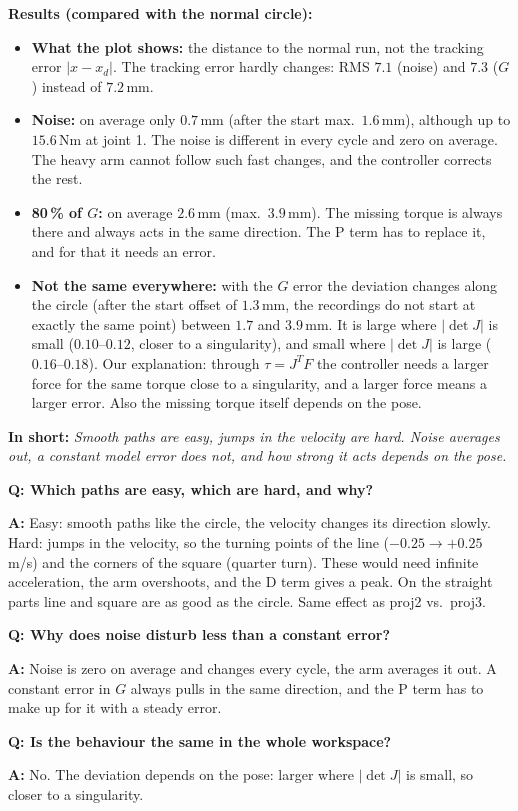 \documentclass[10pt,a4paper]{article}
\newcommand{\frage}[2]{\textbf{Q: #1}\par\nopagebreak\vspace{1pt}\textbf{A:} #2\par\vspace{5pt}}
\newcommand{\sagen}[1]{\textbf{In short:} \emph{#1}\par}
\begin{document}
\textbf{Results (compared with the normal circle):}
\begin{itemize}
  \item \textbf{What the plot shows:} the distance to the normal run, not the tracking error $|x - x_d|$. The tracking error hardly changes: RMS $7.1$ (noise) and $7.3$ ($G$) instead of $7.2$\,mm.
  \item \textbf{Noise:} on average only $0.7$\,mm (after the start max.\ $1.6$\,mm), although up to $15.6$\,Nm at joint 1. The noise is
        different in every cycle and zero on average. The heavy arm cannot follow such fast changes, and the controller
        corrects the rest.
  \item \textbf{80\,\% of $G$:} on average $2.6$\,mm (max.\ $3.9$\,mm). The missing torque is always there and always acts
        in the same direction. The P term has to replace it, and for that it needs an error.
  \item \textbf{Not the same everywhere:} with the $G$ error the deviation changes along the circle (after the start offset of $1.3$\,mm, the recordings do not start at exactly the same point) between $1.7$ and
        $3.9$\,mm. It is large where $|\det J|$ is small ($0.10$--$0.12$, closer to a singularity), and small where
        $|\det J|$ is large ($0.16$--$0.18$). Our explanation: through $\tau = J^T F$ the controller needs a larger force
        for the same torque close to a singularity, and a larger force means a larger error. Also the missing torque
        itself depends on the pose.
\end{itemize}

\sagen{Smooth paths are easy, jumps in the velocity are hard. Noise averages out, a constant model error does not, and
how strong it acts depends on the pose.}

\begin{fragen}
\frage{Which paths are easy, which are hard, and why?}
{Easy: smooth paths like the circle, the velocity changes its direction slowly. Hard: jumps in the velocity, so the
turning points of the line ($-0.25 \to +0.25$\,m/s) and the corners of the square (quarter turn). These would need
infinite acceleration, the arm overshoots, and the D term gives a peak. On the straight parts line and square are as good
as the circle. Same effect as proj2 vs.\ proj3.}
\frage{Why does noise disturb less than a constant error?}
{Noise is zero on average and changes every cycle, the arm averages it out. A constant error in $G$ always pulls in the
same direction, and the P term has to make up for it with a steady error.}
\frage{Is the behaviour the same in the whole workspace?}
{No. The deviation depends on the pose: larger where $|\det J|$ is small, so closer to a singularity.}
\end{fragen}
\end{document}
